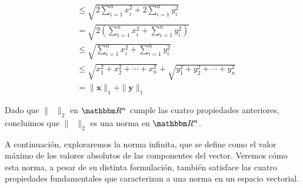 \begin{examplebox}{}{}
\begin{enumerate}[label=\roman*), topsep=6pt, itemsep=0pt]
\begin{align*}
            & \leq \sqrt{2\sum_{i=1}^{n} x_i^2 + 2\sum_{i=1}^{n} y_i^2} \\
            & = \sqrt{2 \left( \sum_{i=1}^{n} x_i^2 + \sum_{i=1}^{n} y_i^2 \right)} \\
            & \leq \sqrt{\sum_{i=1}^{n} x_i^2 + \sum_{i=1}^{n} y_i^2} \\
            & \leq \sqrt{x_1^2 + x_2^2 + \cdots + x_n^2} + \sqrt{y_1^2 + y_2^2 + \cdots + y_n^2} \\
            & = \| \mathbf{x} \|_1 + \| \mathbf{y} \|_1
        \end{align*}
    \end{enumerate}
    Dado que $\| \phantom{x} \|_2$ en $\RR[n]$ cumple las cuatro propiedades anteriores, concluimos que $\| \phantom{x} \|_2$ es una norma en $\RR[n]$.
\end{examplebox}

\newpage

A continuación, exploraremos la norma infinita, que se define como el valor máximo de los valores absolutos de las componentes del vector. Veremos cómo esta norma, a pesar de su distinta formulación, también satisface las cuatro propiedades fundamentales que caracterizan a una norma en un espacio vectorial.


